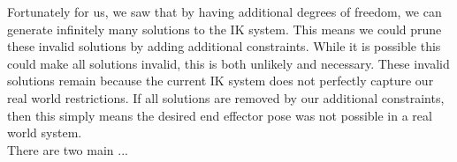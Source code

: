 Fortunately for us, we saw that by having additional degrees of freedom, we can generate infinitely many solutions to the IK system. This means we could prune these invalid solutions by adding additional constraints. While it is possible this could make all solutions invalid, this is both unlikely and necessary. These invalid solutions remain because the current IK system does not perfectly capture our real world restrictions. If all solutions are removed by our additional constraints, then this simply means the desired end effector pose was not possible in a real world system.\\

There are two main ...